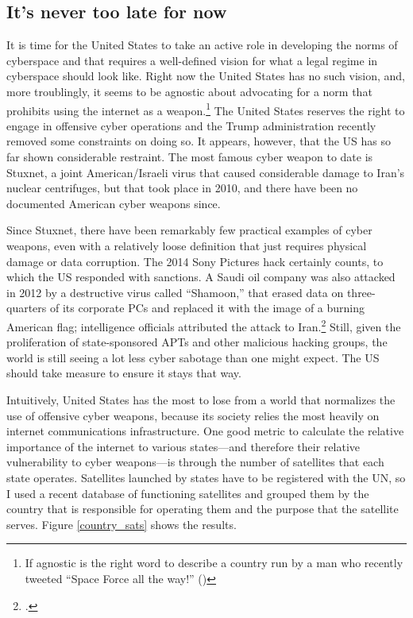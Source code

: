 \documentclass[11pt]{memoir}
\begin{document}
\subsection{It's never too late for now}
It is time for the United States to take an active role in developing the norms of cyberspace and that requires a well-defined vision for what a legal regime in cyberspace should look like. Right now the United States has no such vision, and, more troublingly, it seems to be agnostic about advocating for a norm that prohibits using the internet as a weapon.\footnote{If agnostic is the right word to describe a country run by a man who recently tweeted ``Space Force all the way!'' (\cite{trump_twitter_2018})} The United States reserves the right to engage in offensive cyber operations and the Trump administration recently removed some constraints on doing so. It appears, however, that the US has so far shown considerable restraint. The most famous cyber weapon to date is Stuxnet, a joint American/Israeli virus that caused considerable damage to Iran's nuclear centrifuges, but that took place in 2010, and there have been no documented American cyber weapons since.

Since Stuxnet, there have been remarkably few practical examples of cyber weapons, even with a relatively loose definition that just requires physical damage or data corruption. The 2014 Sony Pictures hack certainly counts, to which the US responded with sanctions. A Saudi oil company was also attacked in 2012 by a destructive virus called ``Shamoon,'' that erased data on three-quarters of its corporate PCs and replaced it with the image of a burning American flag; intelligence officials attributed the attack to Iran.\footcite{perlroth_cyberattack_2012} Still, given the proliferation of state-sponsored APTs and other malicious hacking groups, the world is still seeing a lot less cyber sabotage than one might expect. The US should take measure to ensure it stays that way.

Intuitively, United States has the most to lose from a world that normalizes the use of offensive cyber weapons, because its society relies the most heavily on internet communications infrastructure. One good metric to calculate the relative importance of the internet to various states---and therefore their relative vulnerability to cyber weapons---is through the number of satellites that each state operates. Satellites launched by states have to be registered with the UN, so I used a recent database of functioning satellites and grouped them by the country that is responsible for operating them and the purpose that the satellite serves. Figure \ref{country_sats} shows the results.
\end{document}
